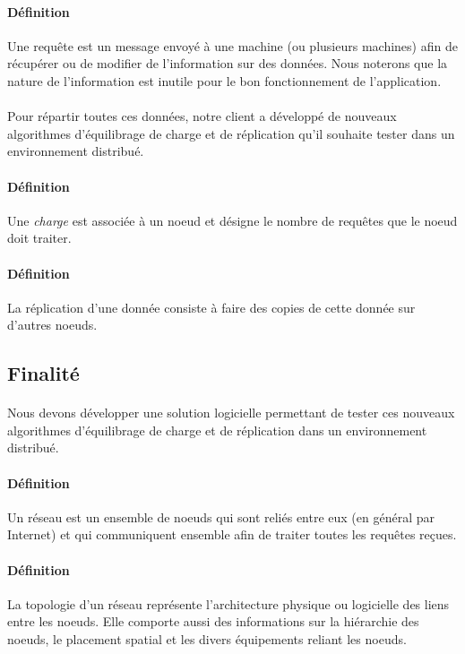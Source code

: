 \documentclass[12pt]{article}
\begin{document}
\paragraph{Définition} Une requête est un message envoyé à une machine (ou plusieurs machines) afin de récupérer ou de modifier de l'information sur des données.
Nous noterons que la nature de l'information est inutile pour le bon fonctionnement de l'application.

\paragraph{} Pour répartir toutes ces données, notre client a développé de nouveaux algorithmes d'équilibrage de charge et de réplication qu'il souhaite tester dans un environnement distribué.

\paragraph{Définition} Une \textit{charge} est associée à un noeud et désigne le nombre de requêtes que le noeud doit traiter. 

\paragraph{Définition} La réplication d'une donnée consiste à faire des copies de cette donnée sur d'autres noeuds.

\subsection{Finalité}

\paragraph{} Nous devons développer une solution logicielle permettant de tester ces nouveaux algorithmes d'équilibrage de charge et de réplication dans un environnement distribué.

\paragraph{Définition} Un réseau est un ensemble de noeuds qui sont reliés entre eux (en général par Internet) et qui communiquent ensemble afin de traiter toutes les requêtes reçues.

\paragraph{Définition} La topologie d'un réseau représente l'architecture physique ou logicielle des liens entre les noeuds. Elle comporte aussi des informations sur la
 hiérarchie des noeuds, le placement spatial et les divers équipements reliant les noeuds.
\end{document}
